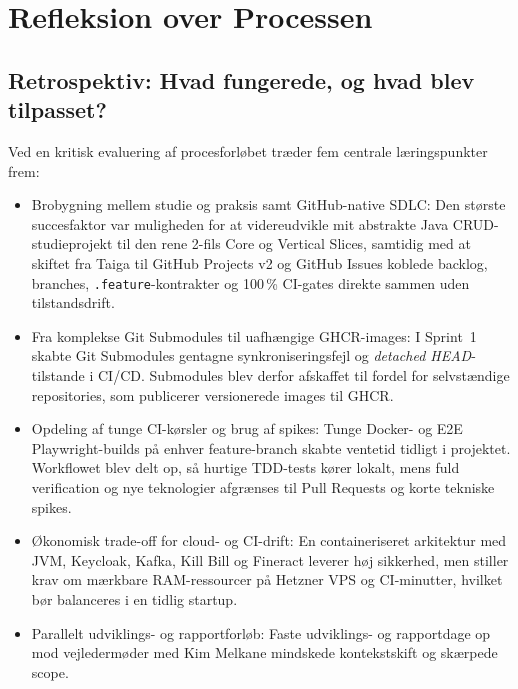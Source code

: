 \documentclass[11pt,a4paper]{article}
\begin{document}
\section{Refleksion over Processen}

\subsection{Retrospektiv: Hvad fungerede, og hvad blev tilpasset?}
Ved en kritisk evaluering af procesforløbet \cite{bloom1956} træder fem centrale læringspunkter frem:
\begin{itemize}[noitemsep]
    \item Brobygning mellem studie og praksis samt GitHub-native SDLC: Den største succesfaktor var muligheden for at videreudvikle mit abstrakte Java CRUD-studieprojekt til den rene 2-fils Core og Vertical Slices, samtidig med at skiftet fra Taiga til GitHub Projects v2 og GitHub Issues koblede backlog, branches, \texttt{.feature}-kontrakter og 100\,\% CI-gates direkte sammen uden tilstandsdrift.
    \item Fra komplekse Git Submodules til uafhængige GHCR-images: I Sprint~1 skabte Git Submodules gentagne synkroniseringsfejl og \textit{detached HEAD}-tilstande i CI/CD. Submodules blev derfor afskaffet til fordel for selvstændige repositories, som publicerer versionerede images til GHCR.
    \item Opdeling af tunge CI-kørsler og brug af spikes: Tunge Docker- og E2E Playwright-builds på enhver feature-branch skabte ventetid tidligt i projektet. Workflowet blev delt op, så hurtige TDD-tests kører lokalt, mens fuld verification og nye teknologier afgrænses til Pull Requests og korte tekniske spikes.
    \item Økonomisk trade-off for cloud- og CI-drift: En containeriseret arkitektur med JVM, Keycloak, Kafka, Kill Bill og Fineract leverer høj sikkerhed, men stiller krav om mærkbare RAM-ressourcer på Hetzner VPS og CI-minutter, hvilket bør balanceres i en tidlig startup.
    \item Parallelt udviklings- og rapportforløb: Faste udviklings- og rapportdage op mod vejledermøder med Kim Melkane mindskede kontekstskift og skærpede scope.
\end{itemize}
\end{document}

